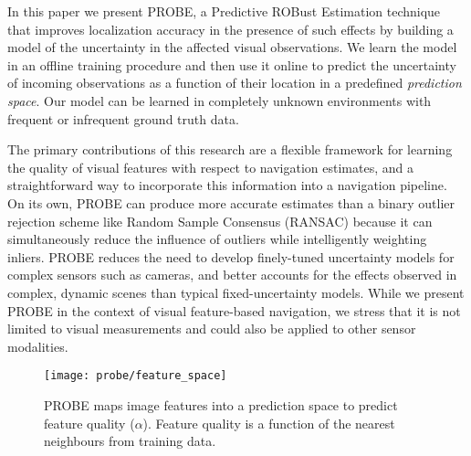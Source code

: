 In this paper we present PROBE, a Predictive ROBust Estimation technique that improves localization accuracy in the presence of such effects by building a model of the uncertainty in the affected visual observations. 
We learn the model in an offline training procedure and then use it online to predict the uncertainty of incoming observations as a function of their location in a predefined \emph{prediction space}.
Our model can be learned in completely unknown environments with frequent or infrequent ground truth data. 

The primary contributions of this research are a flexible framework for learning the quality of visual features with respect to navigation estimates, and a straightforward way to incorporate this information into a navigation pipeline. On its own, PROBE can produce more accurate estimates than a binary outlier rejection scheme like Random Sample Consensus (RANSAC) \cite{Fischler:1981cv} because it can simultaneously reduce the influence of outliers while intelligently weighting inliers. PROBE reduces the need to develop finely-tuned uncertainty models for complex sensors such as cameras, and better accounts for the effects observed in complex, dynamic scenes than typical fixed-uncertainty models. While we present PROBE in the context of visual feature-based navigation, we stress that it is not limited to visual measurements and could also be applied to other sensor modalities.

\begin{figure}
    \centering
    \texttt{[image: probe/feature\_space]}
    \caption{PROBE maps image features into a prediction space to predict feature quality ($\alpha$). Feature quality is a function of the nearest neighbours from training data.}
    \label{fig:probe_feature_space}
\end{figure}

